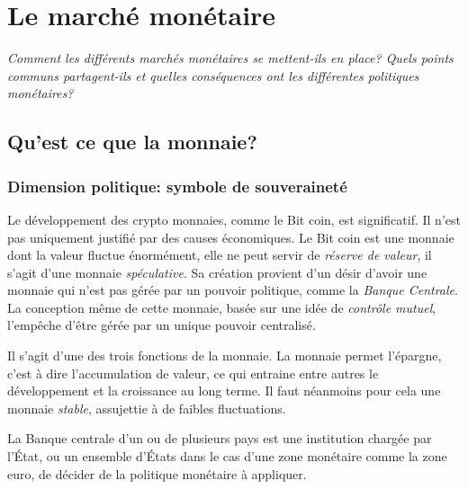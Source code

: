 \documentclass[main.tex]{subfiles}
\begin{document}
        \chapter{Le marché monétaire}
        \textit{Comment les différents marchés monétaires se mettent-ils en place? Quels points communs partagent-ils et quelles conséquences ont les différentes politiques monétaires?}
        \section{Qu'est ce que la monnaie?}
        \subsection{Dimension politique: symbole de souveraineté}
        Le développement des crypto monnaies, comme le Bit coin, est significatif. Il n'est pas uniquement justifié par des causes économiques. Le Bit coin est une monnaie dont la valeur fluctue énormément, elle  ne peut servir de \emph{réserve de valeur}, il s'agit d'une monnaie \emph{spéculative}. Sa création provient d'un désir d'avoir une monnaie qui n'est pas gérée par un pouvoir politique, comme la \emph{Banque Centrale}. La conception même de cette monnaie, basée sur une idée de \emph{contrôle mutuel}, l'empêche d'être gérée par un unique pouvoir centralisé.

        \begin{definition}
                Il s'agit d'une des trois fonctions de la monnaie. La monnaie permet l'épargne, c'est à dire l'accumulation de valeur, ce qui entraine entre autres le développement et la croissance au long terme. Il faut néanmoins pour cela une monnaie \emph{stable}, assujettie à de faibles fluctuations.
        \end{definition}

        \begin{definition}
                La Banque centrale d'un ou de plusieurs pays est une institution chargée par l'État, ou un ensemble d'États dans le cas d’une zone monétaire comme la zone euro, de décider de la politique monétaire à appliquer.
        \end{definition}
\end{document}
